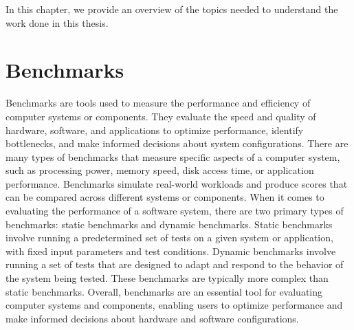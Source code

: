 In this chapter, we provide an overview of the topics needed to understand the work done in this thesis.

\section{Benchmarks}
Benchmarks are tools used to measure the performance and efficiency of computer systems or components.
They evaluate the speed and quality of hardware, software, and applications to optimize performance, identify bottlenecks, and make informed decisions about system configurations.
There are many types of benchmarks that measure specific aspects of a computer system, such as processing power, memory speed, disk access time, or application performance.
Benchmarks simulate real-world workloads and produce scores that can be compared across different systems or components.
When it comes to evaluating the performance of a software system, there are two primary types of benchmarks: static benchmarks and dynamic benchmarks.
Static benchmarks involve running a predetermined set of tests on a given system or application, with fixed input parameters and test conditions.
Dynamic benchmarks involve running a set of tests that are designed to adapt and respond to the behavior of the system being tested. 
These benchmarks are typically more complex than static benchmarks.
Overall, benchmarks are an essential tool for evaluating computer systems and components, enabling users to optimize performance and make informed decisions about hardware and software configurations.\cite{Benchmarking_2022, Benchmarking_2023}

